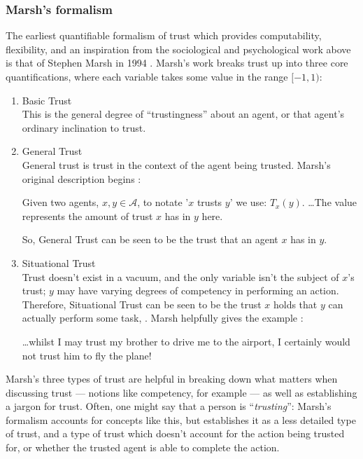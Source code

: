 \subsubsection{Marsh's formalism}
The earliest quantifiable formalism of trust which provides computability, flexibility, and an inspiration from the sociological and psychological work above is that of Stephen Marsh in 1994 \parencite{Marsh1994FormalisingConcept}. Marsh's work breaks trust up into three core quantifications, where each variable takes some value in the range \({[-1,1)}\):
\begin{enumerate}
    \item Basic Trust \\
    This is the general degree of ``trustingness'' about an agent, or that agent's ordinary inclination to trust.
    \item General Trust \\
        General trust is trust in the context of the agent being trusted. Marsh's original description begins \parencite{Marsh1994FormalisingConcept}:
    \begin{displayquote}
        Given two agents, \(x, y \in \mathcal{A}\), to notate '\(x\) trusts \(y\)'  we use: \(T_{x}(y)\). {\ldots}The value represents the amount of trust \(x\) has in \(y\) here.
    \end{displayquote}
    So, General Trust can be seen to be the trust that an agent \(x\) has in \(y\).
    \item Situational Trust \\
        Trust doesn't exist in a vacuum, and the only variable isn't the subject of \(x\)'s trust; \(y\) may have varying degrees of competency in performing an action. Therefore, Situational Trust can be seen to be the trust \(x\) holds that \(y\) can actually perform some task, \safealpha. Marsh helpfully gives the example \parencite[in]{Marsh1994FormalisingConcept}:
    \begin{displayquote}
        {\ldots}whilst I may trust my brother to drive me to the airport, I certainly would not trust him to fly the plane!
    \end{displayquote}
\end{enumerate}\par

Marsh's three types of trust are helpful in breaking down what matters when discussing trust --- notions like competency, for example --- as well as establishing a jargon for trust. Often, one might say that a person is ``\emph{trusting}'': Marsh's formalism accounts for concepts like this, but establishes it as a less detailed type of trust, and a type of trust which doesn't account for the action being trusted for, or whether the trusted agent is able to complete the action.\par

